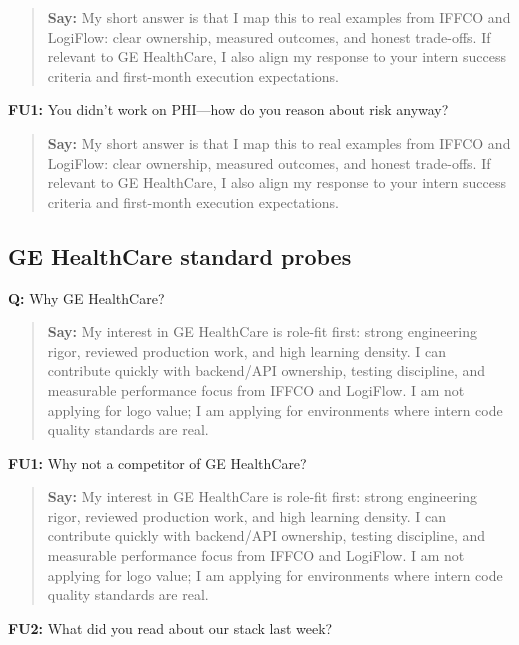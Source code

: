 \documentclass[9pt,a4paper]{article}
\begin{document}
\begin{quote}\small\textbf{Say:} My short answer is that I map this to real examples from IFFCO and LogiFlow: clear ownership, measured outcomes, and honest trade-offs. If relevant to GE HealthCare, I also align my response to your intern success criteria and first-month execution expectations.\end{quote}
\vspace{2mm}
\textbf{FU1:} You didn't work on PHI---how do you reason about risk anyway?

\begin{quote}\small\textbf{Say:} My short answer is that I map this to real examples from IFFCO and LogiFlow: clear ownership, measured outcomes, and honest trade-offs. If relevant to GE HealthCare, I also align my response to your intern success criteria and first-month execution expectations.\end{quote}
\vspace{2mm}
\subsection{GE HealthCare standard probes}
\textbf{Q:} Why GE HealthCare?

\begin{quote}\small\textbf{Say:} My interest in GE HealthCare is role-fit first: strong engineering rigor, reviewed production work, and high learning density. I can contribute quickly with backend/API ownership, testing discipline, and measurable performance focus from IFFCO and LogiFlow. I am not applying for logo value; I am applying for environments where intern code quality standards are real.\end{quote}
\vspace{2mm}
\textbf{FU1:} Why not a competitor of GE HealthCare?

\begin{quote}\small\textbf{Say:} My interest in GE HealthCare is role-fit first: strong engineering rigor, reviewed production work, and high learning density. I can contribute quickly with backend/API ownership, testing discipline, and measurable performance focus from IFFCO and LogiFlow. I am not applying for logo value; I am applying for environments where intern code quality standards are real.\end{quote}
\vspace{2mm}
\textbf{FU2:} What did you read about our stack last week?
\end{document}
